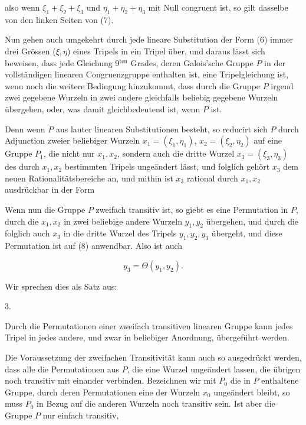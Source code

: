also wenn $\xi_1 + \xi_2 + \xi_3$ und $\eta_1 + \eta_2 + \eta_3$ mit Null congruent
ist, so gilt dasselbe von den linken Seiten von (7).

Nun gehen auch umgekehrt durch jede lineare Substitution der Form (6) immer drei
Grössen ($\xi, \eta$) eines Tripels in ein Tripel über, und daraus lässt sich beweisen,
dass jede Gleichung 9$^{\mathrm{ten}}$ Grades, deren Galois'sche Gruppe $P$ in der
vollständigen linearen Congruenzgruppe enthalten ist, eine Tripelgleichung ist, wenn
noch die weitere Bedingung hinzukommt, dass durch die Gruppe $P$ irgend zwei gegebene
Wurzeln in zwei andere gleichfalls beliebig gegebene Wurzeln übergehen, oder, was damit
gleichbedeutend ist, wenn $P$  ist.

Denn wenn $P$ aus lauter linearen Substitutionen besteht, so reducirt sich $P$ durch
Adjunction zweier beliebiger Wurzeln $x_1 = (\xi_1, \eta_1)$, $x_2 = (\xi_2, \eta_2)$
auf eine Gruppe $P_1$, die nicht nur $x_1, x_2$, sondern auch die dritte Wurzel
$x_3 = (\xi_3, \eta_3)$ des durch $x_1, x_2$ bestimmten Tripels ungeändert lässt, und
folglich gehört $x_3$ dem neuen Rationalitätsbereiche an, und mithin ist $x_3$ rational
durch $x_1, x_2$ ausdrückbar in der Form


Wenn nun die Gruppe $P$ zweifach transitiv ist, so giebt es eine Permutation in $P$,
durch die $x_1, x_2$ in zwei beliebige andere Wurzeln $y_1, y_2$ übergehen, und durch
die folglich auch $x_3$ in die dritte Wurzel des Tripels $y_1, y_2, y_3$ übergeht, und
diese Permutation ist auf (8) anwendbar. Also ist auch

\[
y_3 = \Theta (y_1, y_2).
\]

Wir sprechen dies als Satz aus:

3. 

Durch die Permutationen einer zweifach transitiven linearen Gruppe kann jedes Tripel
in jedes andere, und zwar in beliebiger Anordnung, übergeführt werden.

Die Voraussetzung der zweifachen Transitivität kann auch so ausgedrückt werden, dass
alle die Permutationen aus $P$, die eine Wurzel ungeändert lassen, die übrigen noch
transitiv mit einander verbinden. Bezeichnen wir mit $P_0$ die in $P$ enthaltene
Gruppe, durch deren Permutationen eine der Wurzeln $x_0$ ungeändert bleibt, so muss
$P_0$ in Bezug auf die anderen Wurzeln noch transitiv sein. Ist aber die Gruppe $P$
nur einfach transitiv,
